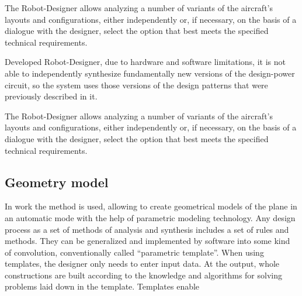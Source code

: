 \documentclass[8pt,twocolumn]{article}
\begin{document}
The Robot-Designer allows analyzing a number of variants of the aircraft’s layouts and configurations, either independently or, if necessary, on the basis of a dialogue with the designer, select the option that best meets the specified technical requirements.

Developed Robot-Designer, due to hardware and software limitations, it is not able to independently synthesize fundamentally new versions of the design-power circuit, so the system uses those versions of the design patterns that were previously described in it.

The Robot-Designer allows analyzing a number of variants of the aircraft’s layouts and configurations, either independently or, if necessary, on the basis of a dialogue with the designer, select the option that best meets the specified technical requirements.
\subsection{Geometry model}
In work the method is used, allowing to create geometrical models of the plane in an automatic mode with the help of parametric modeling technology. Any design process as a set of methods of analysis and synthesis includes a set of rules and methods. They can be generalized and implemented by software into some kind of convolution, conventionally called “parametric template”. When using templates, the designer only needs to enter input data. At the output, whole constructions are built according to the knowledge and algorithms for solving problems laid down in the template. Templates enable
\end{document}
